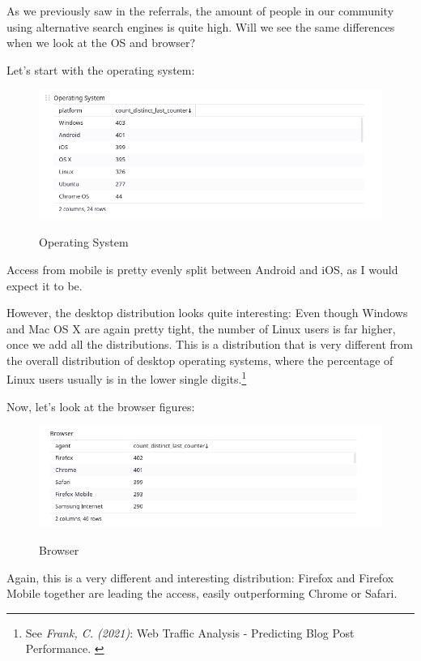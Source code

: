 As we previously saw in the referrals, the amount of people in our community using alternative search engines is quite high. Will we see the same differences when we look at the OS and browser?

Let's start with the operating system:

\begin{figure}[H]
\centering
\caption {Operating System}
\includegraphics[width=\linewidth]{images/figure08.png}
\label{fig:operatingSystem}
\end{figure}

Access from mobile is pretty evenly split between Android and iOS, as I would expect it to be. 

However, the desktop distribution looks quite interesting: Even though Windows and Mac OS X are again pretty tight, the number of Linux users is far higher, once we add all the distributions. This is a distribution that is very different from the overall distribution of desktop operating systems, where the percentage of Linux users usually is in the lower single digits.\footnote{See \textit{Frank, C. (2021)}: Web Traffic Analysis - Predicting Blog Post Performance. \cite{previousBigData}}

Now, let's look at the browser figures:

\begin{figure}[H]
\centering
\caption {Browser}
\includegraphics[width=\linewidth]{images/figure09.png}
\label{fig:browser}
\end{figure}

Again, this is a very different and interesting distribution: Firefox and Firefox Mobile together are leading the access, easily outperforming Chrome or Safari. 

